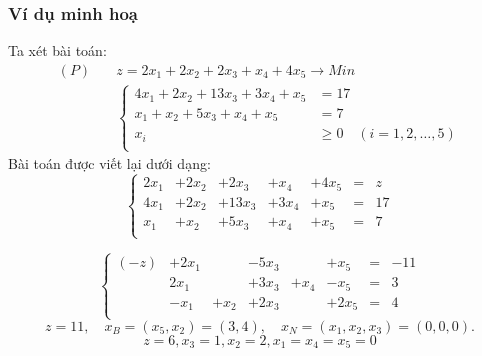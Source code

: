 \documentclass[12pt,a4paper]{report}
\begin{document}
\subsubsection*{Ví dụ minh hoạ}
Ta xét bài toán:
\begin{equation*}
	\begin{split}
	(P) \quad & z = 2x_1 + 2x_2 + 2x_3 + x_4 + 4x_5 \longrightarrow Min \\
		& \left\{\begin{split}
        4x_1 + 2x_2 + 13x_3 + 3x_4 + x_5 &= 17 \\
        x_1 + x_2 + 5x_3 + x_4 +x_5 &= 7 \\
		x_i &\geq 0 \quad (i=1,2,\ldots,5) \\
		\end{split}\right.    
	\end{split}
\end{equation*}
Bài toán được viết lại dưới dạng:
\begin{equation*}
    \left\{\begin{array}{ccccccc}
    2x_1 &+ 2x_2 &+ 2x_3 &+ x_4 &+ 4x_5 &=& z \\
    4x_1 &+ 2x_2 &+ 13x_3 &+ 3x_4 &+ x_5 &=& 17 \\
    x_1 &+ x_2 &+ 5x_3 &+ x_4 &+x_5 &=& 7 \\
    \end{array}\right.
\end{equation*}

\begin{equation*}
    \left\{\begin{array}{cccccccc}
    (-z) &+2x_1 &&-5x_3 &&+ x_5 &=& -11 \\
    &2x_1 &&+ 3x_3 &+ x_4 &- x_5 &=& 3 \\
    &-x_1 &+ x_2 &+ 2x_3 &&+2x_5 &=& 4 \\
    \end{array}\right.
\end{equation*}
\begin{equation*}
z=11, \quad x_B=(x_5,x_2)=(3,4), \quad x_N=(x_1,x_2,x_3)=(0,0,0).
\end{equation*}
\begin{equation*}
z=6, x_3=1, x_2=2, x_1=x_4=x_5=0
\end{equation*}
\end{document}

